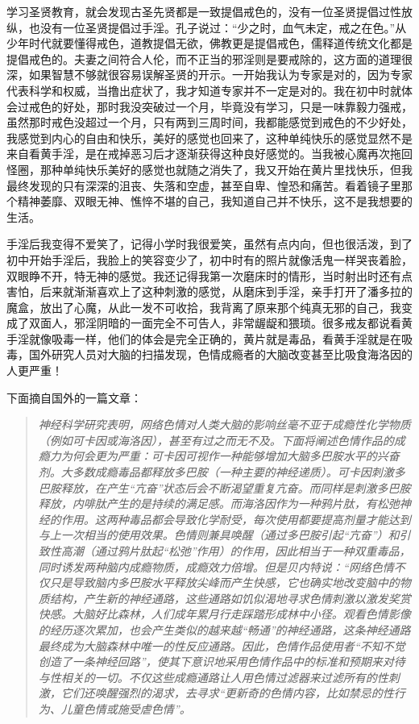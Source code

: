 学习圣贤教育，就会发现古圣先贤都是一致提倡戒色的，没有一位圣贤提倡过性放纵，也没有一位圣贤提倡过手淫。孔子说过：“少之时，血气未定，戒之在色。”从少年时代就要懂得戒色，道教提倡无欲，佛教更是提倡戒色，儒释道传统文化都是提倡戒色的。夫妻之间符合人伦，而不正当的邪淫则是要戒除的，这方面的道理很深，如果智慧不够就很容易误解圣贤的开示。一开始我认为专家是对的，因为专家代表科学和权威，当撸出症状了，我才知道专家并不一定是对的。我在初中时就体会过戒色的好处，那时我没突破过一个月，毕竟没有学习，只是一味靠毅力强戒，虽然那时戒色没超过一个月，只有两到三周时间，我都能感觉到戒色的不少好处，我感觉到内心的自由和快乐，美好的感觉也回来了，这种单纯快乐的感觉显然不是来自看黄手淫，是在戒掉恶习后才逐渐获得这种良好感觉的。当我被心魔再次拖回怪圈，那种单纯快乐美好的感觉也就随之消失了，我又开始在黄片里找快乐，但我最终发现的只有深深的沮丧、失落和空虚，甚至自卑、惶恐和痛苦。看着镜子里那个精神萎靡、双眼无神、憔悴不堪的自己，我知道自己并不快乐，这不是我想要的生活。

手淫后我变得不爱笑了，记得小学时我很爱笑，虽然有点内向，但也很活泼，到了初中开始手淫后，我脸上的笑容变少了，初中时有的照片就像活鬼一样哭丧着脸，双眼睁不开，特无神的感觉。我还记得我第一次磨床时的情形，当时射出时还有点害怕，后来就渐渐喜欢上了这种刺激的感觉，从磨床到手淫，亲手打开了潘多拉的魔盒，放出了心魔，从此一发不可收拾，我背离了原来那个纯真无邪的自己，我变成了双面人，邪淫阴暗的一面完全不可告人，非常龌龊和猥琐。很多戒友都说看黄手淫就像吸毒一样，他们的体会是完全正确的，黄片就是毒品，看黄手淫就是在吸毒，国外研究人员对大脑的扫描发现，色情成瘾者的大脑改变甚至比吸食海洛因的人更严重！

下面摘自国外的一篇文章：

\begin{quote}\it
    神经科学研究表明，网络色情对人类大脑的影响丝毫不亚于成瘾性化学物质（例如可卡因或海洛因），甚至有过之而无不及。下面将阐述色情作品的成瘾力为何会更为严重：可卡因可视作一种能够增加大脑多巴胺水平的兴奋剂。大多数成瘾毒品都释放多巴胺（一种主要的神经递质）。可卡因刺激多巴胺释放，在产生“亢奋”状态后会不断渴望重复亢奋。而同样是刺激多巴胺释放，内啡肽产生的是持续的满足感。而海洛因作为一种鸦片肽，有松弛神经的作用。这两种毒品都会导致化学耐受，每次使用都要提高剂量才能达到与上一次相当的使用效果。色情则兼具唤醒（通过多巴胺引起“亢奋”）和引致性高潮（通过鸦片肽起“松弛”作用）的作用，因此相当于一种双重毒品，同时诱发两种脑内成瘾物质，成瘾效力倍增。但是贝内特说：“网络色情不仅只是导致脑内多巴胺水平释放尖峰而产生快感，它也确实地改变脑中的物质结构，产生新的神经通路，这些通路如饥似渴地寻求色情刺激以激发奖赏快感。大脑好比森林，人们成年累月行走踩踏形成林中小径。观看色情影像的经历逐次累加，也会产生类似的越来越“畅通”的神经通路，这条神经通路最终成为大脑森林中唯一的性反应通路。因此，色情作品使用者“不知不觉创造了一条神经回路”，使其下意识地采用色情作品中的标准和预期来对待与性相关的一切。不仅这些成瘾通路让人用色情过滤器来过滤所有的性刺激，它们还唤醒强烈的渴求，去寻求“更新奇的色情内容，比如禁忌的性行为、儿童色情或施受虐色情”。
\end{quote}

